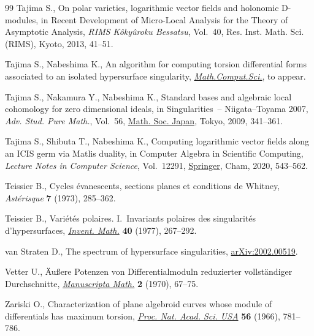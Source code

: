 \documentclass[pdftex]{sigma}%
\numberwithin{equation}{section}
\begin{document}
\begin{thebibliography}{99}
Tajima S., On polar varieties, logarithmic vector fields and holonomic
 {D}-modules, in Recent Development of Micro-Local Analysis for the Theory of
 Asymptotic Analysis, \textit{RIMS K\^oky\^uroku Bessatsu}, Vol.~40, Res.
 Inst. Math. Sci. (RIMS), Kyoto, 2013, 41--51.

Tajima S., Nabeshima K., An algorithm for computing torsion differential forms
 associated to an isolated hypersurface singularity, \href{https://doi.org/10.1007/s11786-020-00486-w}{\textit{Math.Comput.Sci.}},
 {t}o appear.

Tajima S., Nakamura Y., Nabeshima K., Standard bases and algebraic local
 cohomology for zero dimensional ideals, in Singularities~--
 {N}iigata--{T}oyama 2007, \textit{Adv. Stud. Pure Math.}, Vol.~56, \href{https://doi.org/10.2969/aspm/05610341}{Math. Soc.
 Japan}, Tokyo, 2009, 341--361.

Tajima S., Shibuta T., Nabeshima K., Computing logarithmic vector fields along
 an {ICIS} germ via {M}atlis duality, in Computer Algebra in Scientific
 Computing, \textit{Lecture Notes in Computer Science}, Vol.~12291, \href{https://doi.org/10.1007/978-3-030-60026-6_32}{Springer},
 Cham, 2020, 543--562.

Teissier B., Cycles \'evanescents, sections planes et conditions de {W}hitney,
 \textit{Ast\'erisque} \textbf{7} (1973), 285--362.

Teissier B., Vari\'et\'es polaires. {I}.~{I}nvariants polaires des
 singularit\'es d'hypersurfaces, \href{https://doi.org/10.1007/BF01425742}{\textit{Invent. Math.}} \textbf{40} (1977),
 267--292.

van Straten D., The spectrum of hypersurface singularities,
 \href{https://arxiv.org/abs/2002.00519}{arXiv:2002.00519}.

Vetter U., \"Au{\ss}ere {P}otenzen von {D}ifferentialmoduln reduzierter
 vollst\"andiger {D}urchschnitte, \href{https://doi.org/10.1007/BF01168480}{\textit{Manuscripta Math.}} \textbf{2}
 (1970), 67--75.

Zariski O., Characterization of plane algebroid curves whose module of
 differentials has maximum torsion, \href{https://doi.org/10.1073/pnas.56.3.781}{\textit{Proc. Nat. Acad. Sci. USA}}
 \textbf{56} (1966), 781--786.

\end{thebibliography}\LastPageEnding
\end{document}
